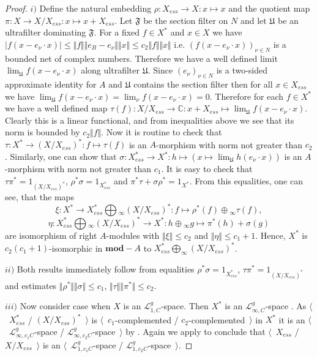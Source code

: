 \documentclass[12pt]{article}
\begin{document}
\begin{proof} $i)$ Define the natural embedding $\rho:X_{ess}\to X:x\mapsto x$ and the quotient map  $\pi:X\to X/X_{ess}:x\mapsto x+X_{ess}$. Let $\mathfrak{F}$ be the section filter on $N$ and let $\mathfrak{U}$ be an ultrafilter dominating $\mathfrak{F}$. For a fixed $f\in X ^*$ and $x\in X $ we have $|f(x-e_\nu\cdot x)|\leq\Vert f\Vert\Vert e_B - e_\nu\Vert\Vert x\Vert\leq c_2\Vert f\Vert\Vert x\Vert$ i.e. $(f(x-e_\nu\cdot x))_{\nu\in N}$ is a bounded net of complex numbers. Therefore we have a well defined limit $\lim_{\mathfrak{U}}f(x-e_\nu\cdot x)$ along ultrafilter $\mathfrak{U}$. Since $(e_\nu)_{\nu\in N}$ is a two-sided approximate identity for $A$ and $\mathfrak{U}$ contains the section filter then for all $x\in X_{ess}$ we have $\lim_{\mathfrak{U}}f(x-e_\nu\cdot x)=\lim_{\nu}f(x-e_\nu\cdot x)=0$. Therefore for each $f\in X ^*$ we have a well defined map $\tau(f):X /X_{ess}\to \mathbb{C}:x+X_{ess}\mapsto \lim_{\mathfrak{U}} f(x-e_\nu\cdot x)$. Clearly this is a linear functional, and from inequalities above we see that its norm is bounded by $c_2\Vert f\Vert$. Now it is routine to check that $\tau:X^*\to (X/ X_{ess})^*:f\mapsto \tau(f)$ is an $A$-morphism with norm not greater than $c_2$. Similarly, one can show that $\sigma:X_{ess}^*\to X^*:h\mapsto(x\mapsto \lim_{\mathfrak{U}}h(e_\nu\cdot x))$ is an $A$-morphism with norm not greater than $c_1$. It is easy to check that $\tau \pi^*=1_{(X/X_{ess})^*}$, $\rho^*\sigma=1_{X_{ess}^*}$ and  $\pi^*\tau+\sigma\rho^*=1_{X^*}$. From this equalities, one can see, that the maps
\[
\xi:X^*\to X_{ess}^*\bigoplus{}_\infty (X/X_{ess})^*:f\mapsto \rho^*(f)\oplus{}_\infty \tau(f),
\]
\[
\eta:X_{ess}^*\bigoplus{}_\infty (X/X_{ess})^*\to X^*:h\oplus{}_\infty g\mapsto \pi^*(h)+\sigma(g)
\]
are isomorphism of right $A$-modules with $\Vert\xi \Vert\leq c_2$ and $\Vert \eta\Vert\leq c_1+1$. Hence, $X^*$ is $c_2(c_1+1)$-isomorphic in $\mathbf{mod}-A$ to $X_{ess}^*\bigoplus_\infty (X/X_{ess})^*$.

$ii)$ Both results immediately follow from equalities $\rho^*\sigma=1_{X_{ess}^*}$, $\tau \pi^*=1_{(X/X_{ess})^*}$ and estimates $\Vert \rho^*\Vert\Vert \sigma\Vert\leq c_1$, $\Vert\tau\Vert\Vert \pi^*\Vert\leq c_2$.

$iii)$ Now consider case when $X$ is an $\mathcal{L}_{1,C}^g$-space. Then $X^*$ is an $\mathcal{L}_{\infty,C}^g$-space \cite[corollary 23.2.1(1)]{DefFloTensNorOpId}. As $\langle$~$X_{ess}^*$ / $(X/X_{ess})^*$~$\rangle$ is $\langle$~$c_1$-complemented / $c_2$-complemented~$\rangle$ in $X^*$ it is an $\langle$~$\mathcal{L}_{\infty,c_1C}^g$-space / $\mathcal{L}_{\infty,c_2C}^g$-space~$\rangle$ by \cite[corollary 23.2.1(1)]{DefFloTensNorOpId}. Again we apply \cite[corollary 23.2.1(1)]{DefFloTensNorOpId} to conclude that $\langle$~$X_{ess}$  / $X/X_{ess}$~$\rangle$ is an $\langle$~$\mathcal{L}_{1,c_1C}^g$-space / $\mathcal{L}_{1,c_2C}^g$-space~$\rangle$.
\end{proof}
\end{document}
